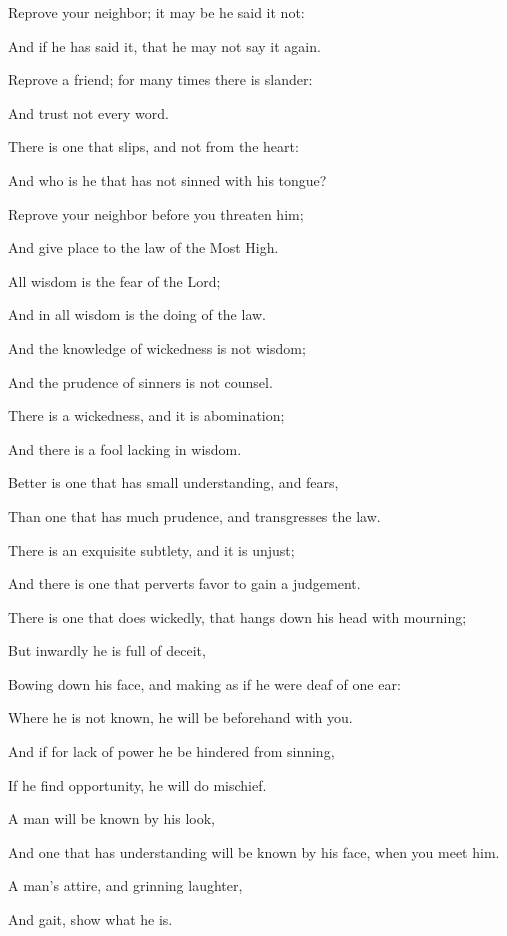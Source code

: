 {\par }{\Q {}Reprove your neighbor; it may be he said it not:
\par }{\Q And if he has said it, that he may not say it again.
\par }{\Q {}Reprove a friend; for many times there is slander:
\par }{\Q And trust not every word.
\par }{\Q {}There is one that slips, and not from the heart:
\par }{\Q And who is he that has not sinned with his tongue?
\par }{\Q {}Reprove your neighbor before you threaten him;
\par }{\Q And give place to the law of the Most High.
\par }{\BB \par }{\Q {}All wisdom is the fear of the Lord;
\par }{\Q And in all wisdom is the doing of the law.
\par }{\Q {}And the knowledge of wickedness is not wisdom;
\par }{\Q And the prudence of sinners is not counsel.
\par }{\Q {}There is a wickedness, and it is abomination;
\par }{\Q And there is a fool lacking in wisdom.
\par }{\Q {}Better is one that has small understanding, and fears,
\par }{\Q Than one that has much prudence, and transgresses the law.
\par }{\Q {}There is an exquisite subtlety, and it is unjust;
\par }{\Q And there is one that perverts favor
 to gain a judgement.
\par }{\Q {}There is one that does wickedly, that hangs down his head with mourning;
\par }{\Q But inwardly he is full of deceit,
\par }{\Q {}Bowing down his face, and making as if he were deaf of one ear:
\par }{\Q Where he is not known, he will be beforehand with you.
\par }{\Q {}And if for lack of power he be hindered from sinning,
\par }{\Q If he find opportunity, he will do mischief.
\par }{\Q {}A man will be known by his look,
\par }{\Q And one that has understanding will be known by his face, when you meet him.
\par }{\Q {}A man’s attire, and
 grinning laughter,
\par }{\Q And gait, show what he is.
\par }{\BB \par }
